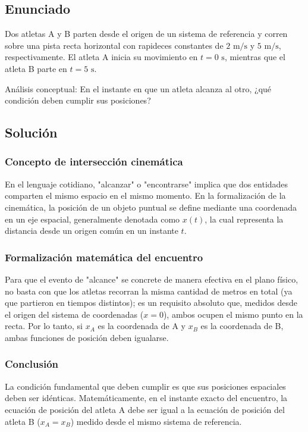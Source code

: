 \documentclass[12pt, a4paper]{article}
\begin{document}
\newpage
\subsection*{Enunciado}
 Dos atletas A y B parten desde el origen de un sistema de referencia y corren sobre una pista recta horizontal con rapideces constantes de $2\text{ m/s}$ y $5\text{ m/s}$, respectivamente. El atleta A inicia su movimiento en $t = 0\text{ s}$, mientras que el atleta B parte en $t = 5\text{ s}$.

Análisis conceptual: En el instante en que un atleta alcanza al otro, ¿qué condición deben cumplir sus posiciones?

\subsection*{Solución}

\subsubsection*{Concepto de intersección cinemática}
En el lenguaje cotidiano, "alcanzar" o "encontrarse" implica que dos entidades comparten el mismo espacio en el mismo momento. En la formalización de la cinemática, la posición de un objeto puntual se define mediante una coordenada en un eje espacial, generalmente denotada como $x(t)$, la cual representa la distancia desde un origen común en un instante $t$.

\subsubsection*{Formalización matemática del encuentro}
Para que el evento de "alcance" se concrete de manera efectiva en el plano físico, no basta con que los atletas recorran la misma cantidad de metros en total (ya que partieron en tiempos distintos); es un requisito absoluto que, medidos desde el origen del sistema de coordenadas ($x=0$), ambos ocupen el mismo punto en la recta. Por lo tanto, si $x_A$ es la coordenada de A y $x_B$ es la coordenada de B, ambas funciones de posición deben igualarse.

\subsubsection*{Conclusión}
La condición fundamental que deben cumplir es que sus posiciones espaciales deben ser idénticas. Matemáticamente, en el instante exacto del encuentro, la ecuación de posición del atleta A debe ser igual a la ecuación de posición del atleta B ($x_A = x_B$) medido desde el mismo sistema de referencia.
\end{document}
